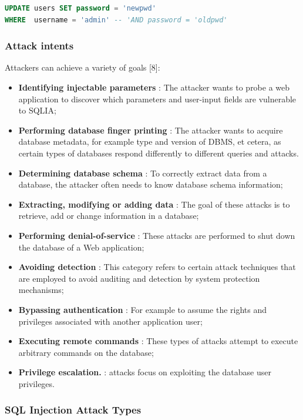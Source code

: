 \begin{lstlisting}[language=sql, caption=The resulting query string., label=listing:sql-injection:second-order:sql]
UPDATE users SET password = 'newpwd'
WHERE  username = 'admin' -- 'AND password = 'oldpwd'
\end{lstlisting}



\subsubsection{Attack intents}

Attackers can achieve a variety of goals [8]:
\begin{itemize}
	\item \textbf{Identifying injectable parameters} : The attacker wants to probe a web application to discover which parameters and user-input fields are vulnerable to SQLIA;
	\item \textbf{Performing database finger printing} : The attacker wants to acquire database metadata, for example type and version of DBMS, et cetera, as certain types of databases respond differently to different queries and attacks.
	\item \textbf{Determining database schema} : To correctly extract data from a database, the attacker often needs to know database schema information;
	\item \textbf{Extracting, modifying or adding data} : The goal of these attacks is to retrieve, add or change information in a database;
	\item \textbf{Performing denial-of-service} :  These attacks are performed to shut down the database of a Web application;
	\item \textbf{Avoiding detection} : This category refers to certain attack techniques that are employed to avoid auditing and detection by system protection mechanisms;
	\item \textbf{Bypassing authentication} : For example to assume the rights and privileges associated with another application user;
	\item \textbf{Executing remote commands} : These types of attacks attempt to execute arbitrary commands on the database;
	\item \textbf{Privilege escalation.} : attacks focus on exploiting the database user privileges.
\end{itemize}


\subsubsection{SQL Injection Attack Types}

